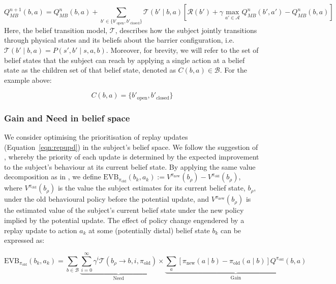 \begin{equation}
    Q_{MB}^{n+1}(b, a) = Q_{MB}^n(b, a) + \sum_{b' \in \{ b'_{\text{open}}, b'_{\text{closed}} \}} \mathcal{T}(b'\mid b, a)\left[ \mathcal{R}(b') + \gamma \max_{a'\in\mathcal{A}} Q_{MB}^n(b', a') - Q_{MB}^n(b, a) \right]
    \label{eqn:repupd}
\end{equation}
Here, the belief transition model, $\mathcal{T}$, describes how the subject jointly transitions through physical states and its beliefs about the barrier configuration, i.e. $\mathcal{T}(b'\mid b, a)=P(s', b'\mid s, a, b)$. Moreover, for brevity, we will refer to the set of belief states that the subject can reach by applying a single action at a belief state as the children set of that belief state, denoted as $C(b, a) \in \mathcal{B}$. For the example above: 

\begin{equation}
    C(b, a) = \{ b'_{\text{open}}, b'_{\text{closed}} \}
    \label{eqn:children}
\end{equation}

\subsubsection*{Gain and Need in belief space}
We consider optimising the prioritisation of replay updates (Equation~\ref{eqn:repupd}) in the subject's belief space. We follow the suggestion of \textcite{mattarPrioritizedMemoryAccess2018}, whereby the priority of each update is determined by the expected improvement to the subject's behaviour at its current belief state. By applying the same value decomposition as in \textcite{mattarPrioritizedMemoryAccess2018}, we define $\text{EVB}_{\pi_{\text{old}}}(b_k, a_k):=V^{\pi_\text{new}}(b_\rho) - V^{\pi_{\text{old}}}(b_\rho)$, where $V^{\pi_{\text{old}}}(b_\rho)$ is the value the subject estimates for its current belief state, $b_\rho$, under the old behavioural policy before the potential update, and $V^{\pi_\text{new}}(b_\rho)$ is the estimated value of the subject's current belief state under the new policy implied by the potential update. The effect of policy change engendered by a replay update to action $a_k$ at some (potentially distal) belief state $b_k$ can be expressed as:

\begin{equation}
    \text{EVB}_{\pi_{\text{old}}}(b_k, a_k) = \sum_{b\in \mathcal{B}} \underbrace{\sum_{i=0}^{\infty} \gamma^i \mathcal{T}(b_\rho \rightarrow b, i, \pi_{\text{old}})}_{\text{Need}} \times \underbrace{\sum_{a}\left[\pi_{\text{new}}(a\mid b) - \pi_{\text{old}}(a\mid b)\right]Q^{\pi_{\text{old}}}(b, a)}_{\text{Gain}}
    \label{eqn:evb}
\end{equation}

